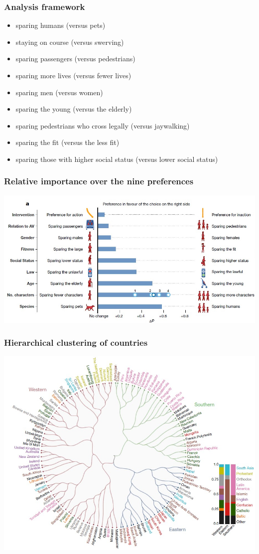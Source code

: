 \documentclass[aspectratio=169]{beamer}
\begin{document}
\begin{frame}
    \frametitle{Analysis framework}
    \begin{itemize}
        \item sparing humans (versus pets)
        \item staying on course (versus swerving)
        \item sparing passengers (versus pedestrians)
        \item sparing more lives (versus fewer lives)
        \item sparing men (versus women)
        \item sparing the young (versus the elderly)
        \item sparing pedestrians who cross legally (versus jaywalking)
        \item sparing the fit (versus the less fit)
        \item sparing those with higher social status (versus lower social status)
    \end{itemize}
\end{frame}

\begin{frame}
    \frametitle{Relative importance over the nine preferences}
    \includegraphics{assets/relative-importance-mme.jpg}
\end{frame}

\begin{frame}
    \frametitle{Hierarchical clustering of countries}
    \includegraphics{assets/countries-mme.jpg}
\end{frame}
\end{document}

